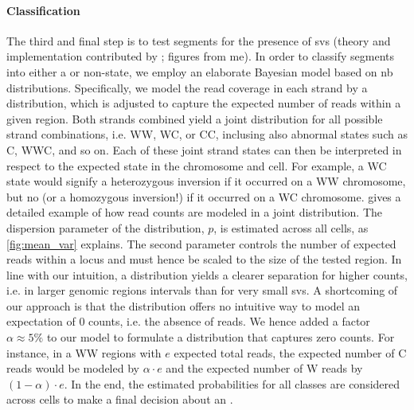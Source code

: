 
\paragraph{Classification} The third and final step is to test segments for the
presence of \acp{sv} (theory and implementation contributed by \maryam; figures
from me). In order to classify segments into either a \sv or non-\sv state, we
employ an elaborate Bayesian model based on \acl{nb} distributions.
Specifically, we model the read coverage in each strand by a \nb distribution,
which is adjusted to capture the expected number of reads within a given region.
Both strands combined yield a joint distribution for all possible strand
combinations, i.e. WW, WC, or CC, inclusing also abnormal states such as C, WWC,
and so on. Each of these joint strand states can then be interpreted in respect
to the expected state in the chromosome and cell. For example, a WC state would
signify a heterozygous inversion if it occurred on a WW chromosome, but no \sv
(or a homozygous inversion!) if it occurred on a WC chromosome.
 gives a detailed example of how read counts are modeled
in a joint \nb distribution. The dispersion parameter of the \nb distribution,
$p$, is estimated across all cells, as \cref{fig:mean_var} explains. The second
\nb parameter controls the number of expected reads within a locus and must
hence be scaled to the size of the tested region. In line with our intuition,
a \nb distribution yields a clearer separation for higher counts, i.e. in larger
genomic regions intervals than for very small \acp{sv}. A shortcoming of our
approach is that the \nb distribution offers no intuitive way to model an
expectation of 0 counts, i.e. the absence of reads. We hence added a factor
$\alpha \approx 5\%$ to our model to formulate a \nb distribution that captures
zero counts. For instance, in a WW regions with $e$ expected total reads, the
expected number of C reads would be modeled by $\alpha \cdot e$ and the expected
number of W reads by $(1-\alpha) \cdot e$. In the end, the
estimated \nb probabilities for all \sv classes are considered across cells to
make a final decision about an \sv.

